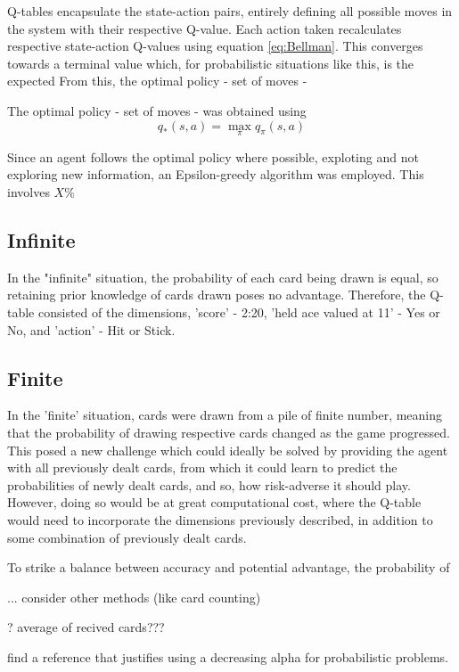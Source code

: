 \smallskip
Q-tables encapsulate the state-action pairs, entirely defining all possible moves in the system with their respective Q-value. Each action taken recalculates respective state-action Q-values using equation \ref{eq:Bellman}. This converges towards a terminal value which, for probabilistic situations like this, is the expected
From this, the optimal policy - set of moves - 

\smallskip
The optimal policy - set of moves - was obtained using 
\begin{equation}
    q_*(s,a) = \max_{\pi}q_{\pi}(s,a)
\end{equation}

Since an agent follows the optimal policy where possible, exploting  and not exploring new information, an Epsilon-greedy algorithm was employed. This involves    \(X\%\)

\subsection{Infinite}

In the "infinite" situation, the probability of each card being drawn is equal, so retaining prior knowledge of cards drawn poses no advantage. Therefore, the Q-table consisted of the dimensions, 'score' - 2:20, 'held ace valued at 11' - Yes or No, and 'action' - Hit or Stick.


\subsection{Finite}

In the 'finite' situation, cards were drawn from a pile of finite number, meaning that the probability of drawing respective cards changed as the game progressed. This posed a new challenge which could ideally be solved by providing the agent with all previously dealt cards, from which it could learn to predict the probabilities of newly dealt cards, and so, how risk-adverse it should play. However, doing so would be at great computational cost, where the Q-table would need to incorporate the dimensions previously described, in addition to some combination of previously dealt cards. 

To strike a balance between accuracy and potential advantage, the probability of 

... consider other methods (like card counting)

? average of recived cards???

find a reference that justifies using a decreasing alpha for probabilistic problems. 
